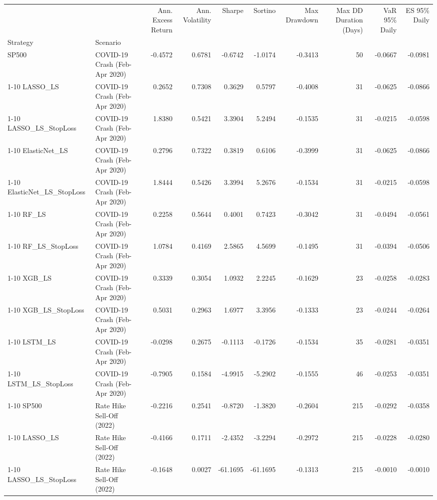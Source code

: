 \begin{tabular}{llrrrrrrrr}
\toprule
 &  & Ann. Excess Return & Ann. Volatility & Sharpe & Sortino & Max Drawdown & Max DD Duration (Days) & VaR 95\% Daily & ES 95\% Daily \\
Strategy & Scenario &  &  &  &  &  &  &  &  \\
\midrule
SP500 & COVID-19 Crash (Feb-Apr 2020) & -0.4572 & 0.6781 & -0.6742 & -1.0174 & -0.3413 & 50 & -0.0667 & -0.0981 \\
\cline{1-10}
LASSO\_LS & COVID-19 Crash (Feb-Apr 2020) & 0.2652 & 0.7308 & 0.3629 & 0.5797 & -0.4008 & 31 & -0.0625 & -0.0866 \\
\cline{1-10}
LASSO\_LS\_StopLoss & COVID-19 Crash (Feb-Apr 2020) & 1.8380 & 0.5421 & 3.3904 & 5.2494 & -0.1535 & 31 & -0.0215 & -0.0598 \\
\cline{1-10}
ElasticNet\_LS & COVID-19 Crash (Feb-Apr 2020) & 0.2796 & 0.7322 & 0.3819 & 0.6106 & -0.3999 & 31 & -0.0625 & -0.0866 \\
\cline{1-10}
ElasticNet\_LS\_StopLoss & COVID-19 Crash (Feb-Apr 2020) & 1.8444 & 0.5426 & 3.3994 & 5.2676 & -0.1534 & 31 & -0.0215 & -0.0598 \\
\cline{1-10}
RF\_LS & COVID-19 Crash (Feb-Apr 2020) & 0.2258 & 0.5644 & 0.4001 & 0.7423 & -0.3042 & 31 & -0.0494 & -0.0561 \\
\cline{1-10}
RF\_LS\_StopLoss & COVID-19 Crash (Feb-Apr 2020) & 1.0784 & 0.4169 & 2.5865 & 4.5699 & -0.1495 & 31 & -0.0394 & -0.0506 \\
\cline{1-10}
XGB\_LS & COVID-19 Crash (Feb-Apr 2020) & 0.3339 & 0.3054 & 1.0932 & 2.2245 & -0.1629 & 23 & -0.0258 & -0.0283 \\
\cline{1-10}
XGB\_LS\_StopLoss & COVID-19 Crash (Feb-Apr 2020) & 0.5031 & 0.2963 & 1.6977 & 3.3956 & -0.1333 & 23 & -0.0244 & -0.0264 \\
\cline{1-10}
LSTM\_LS & COVID-19 Crash (Feb-Apr 2020) & -0.0298 & 0.2675 & -0.1113 & -0.1726 & -0.1534 & 35 & -0.0281 & -0.0351 \\
\cline{1-10}
LSTM\_LS\_StopLoss & COVID-19 Crash (Feb-Apr 2020) & -0.7905 & 0.1584 & -4.9915 & -5.2902 & -0.1555 & 46 & -0.0253 & -0.0351 \\
\cline{1-10}
SP500 & Rate Hike Sell-Off (2022) & -0.2216 & 0.2541 & -0.8720 & -1.3820 & -0.2604 & 215 & -0.0292 & -0.0358 \\
\cline{1-10}
LASSO\_LS & Rate Hike Sell-Off (2022) & -0.4166 & 0.1711 & -2.4352 & -3.2294 & -0.2972 & 215 & -0.0228 & -0.0280 \\
\cline{1-10}
LASSO\_LS\_StopLoss & Rate Hike Sell-Off (2022) & -0.1648 & 0.0027 & -61.1695 & -61.1695 & -0.1313 & 215 & -0.0010 & -0.0010 \\

\end{tabular}
